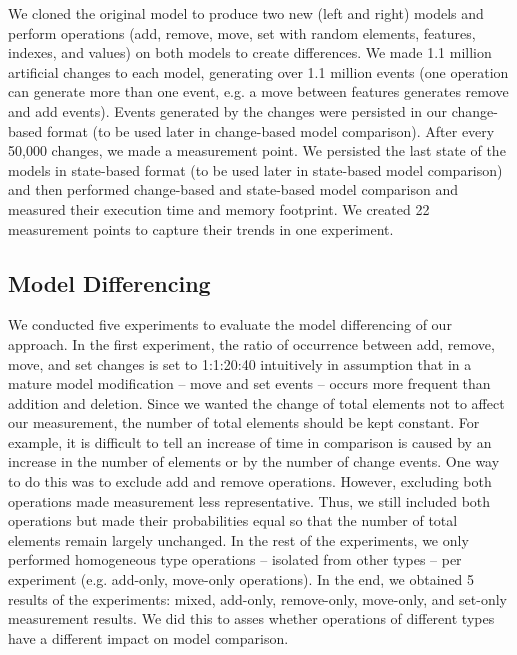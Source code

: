 We cloned the original model to produce two new (left and right) models and perform operations (\textsf{add}, \textsf{remove}, \textsf{move}, \textsf{set} with random elements, features, indexes, and values) on both models to create differences. We made 1.1 million artificial changes to each model, generating over 1.1 million events (one operation can generate more than one event, e.g. a \textsf{move} between features generates \textsf{remove} and \textsf{add} events). Events generated by the changes were persisted in our change-based format (to be used later in change-based model comparison). After every 50,000 changes, we made a measurement point. We persisted the last state of the models in state-based format (to be used later in state-based model comparison) and then performed change-based and state-based model comparison and measured their execution time and memory footprint. We created 22 measurement points to capture their trends in one experiment. 

\subsection{Model Differencing}
\label{sec:differencing_evaluation}

We conducted five experiments to evaluate the model differencing of our approach.
In the first experiment, the ratio of occurrence between \textsf{add}, \textsf{remove}, \textsf{move}, and \textsf{set} changes is set to 1:1:20:40 intuitively in assumption that in a mature model modification -- \textsf{move} and \textsf{set} events -- occurs more frequent than addition and deletion. Since we wanted the change of total elements not to affect our measurement, the number of total elements should be kept constant. For example, it is difficult to tell an increase of time in comparison is caused by an increase in the number of elements or by the number of change events. One way to do this was to exclude \textsf{add} and \textsf{remove} operations. However, excluding both operations made measurement less representative. Thus, we still included both operations but made their probabilities equal so that the number of total elements remain largely unchanged. In the rest of the experiments,
we only performed homogeneous type operations -- isolated from other types -- per experiment (e.g. add-only, move-only operations). In the end, we obtained 5 results of the experiments: mixed, add-only, remove-only, move-only, and set-only measurement results. We did this to asses whether operations of different types have a different impact on model comparison.

